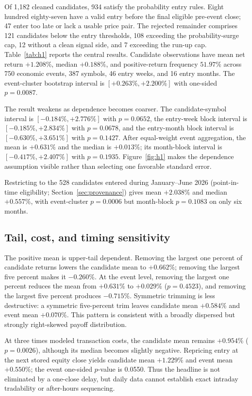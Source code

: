 \documentclass[sigconf,anonymous]{acmart}
\begin{document}
Of 1,182 cleaned candidates, 934 satisfy the probability entry rules. Eight hundred eighty-seven have a valid entry before the final eligible pre-event close; 47 enter too late or lack a usable price pair. The rejected remainder comprises 121 candidates below the entry thresholds, 108 exceeding the probability-surge cap, 12 without a clean signal side, and 7 exceeding the run-up cap. Table~\ref{tab:h1} reports the central results. Candidate observations have mean net return $+1.208\%$, median $+0.188\%$, and positive-return frequency $51.97\%$ across 750 economic events, 387 symbols, 46 entry weeks, and 16 entry months. The event-cluster bootstrap interval is $[+0.263\%,+2.200\%]$ with one-sided $p=0.0087$.

The result weakens as dependence becomes coarser. The candidate-symbol interval is $[-0.184\%,+2.776\%]$ with $p=0.0652$, the entry-week block interval is $[-0.185\%,+2.834\%]$ with $p=0.0678$, and the entry-month block interval is $[-0.630\%,+3.651\%]$ with $p=0.1427$. After equal-weight event aggregation, the mean is $+0.631\%$ and the median is $+0.013\%$; its month-block interval is $[-0.417\%,+2.407\%]$ with $p=0.1935$. Figure~\ref{fig:h1} makes the dependence assumption visible rather than selecting one favorable standard error.

Restricting to the 528 candidates entered during January--June 2026 (point-in-time eligibility; Section~\ref{sec:provenance}) gives mean $+2.038\%$ and median $+0.557\%$, with event-cluster $p=0.0006$ but month-block $p=0.1083$ on only six months.



\subsection{Tail, cost, and timing sensitivity}

The positive mean is upper-tail dependent. Removing the largest one percent of candidate returns lowers the candidate mean to $+0.662\%$; removing the largest five percent makes it $-0.260\%$. At the event level, removing the largest one percent reduces the mean from $+0.631\%$ to $+0.029\%$ ($p=0.4523$), and removing the largest five percent produces $-0.715\%$. Symmetric trimming is less destructive: a symmetric five-percent trim leaves candidate mean $+0.584\%$ and event mean $+0.070\%$. This pattern is consistent with a broadly dispersed but strongly right-skewed payoff distribution.

At three times modeled transaction costs, the candidate mean remains $+0.954\%$ ($p=0.0026$), although its median becomes slightly negative. Repricing entry at the next stored equity close yields candidate mean $+1.229\%$ and event mean $+0.550\%$; the event one-sided $p$-value is 0.0550. Thus the headline is not eliminated by a one-close delay, but daily data cannot establish exact intraday tradability or after-hours sequencing.
\end{document}
